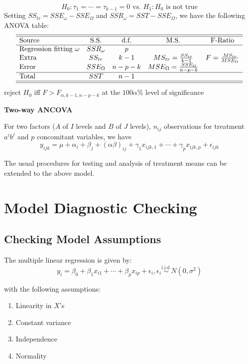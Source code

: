 \documentclass[11pt,a4paper]{article}
\begin{document}
\[
H_0: \tau_1 = \cdots = \tau_{k-1} = 0 \text{ vs. } H_1: H_0 \text{ is not true}
\]
Setting $SS_{tr} = SSE_{\omega} - SSE_{\Omega}$ and $SSR_{\omega} = SST - SSE_{\Omega}$, we have the following ANOVA table:
\[
\begin{array}{lcccc}
    \hline\hline
    \text{Source} & \text{S.S.} & \text{d.f.} & \text{M.S.} & \text{F-Ratio} \\
    \hline
    \text{Regression fitting $\omega$} & SSR_{\omega} & p & & \\
    \text{Extra} & SS_{tr} & k-1 & MS_{tr} = \frac{SS_{tr}}{k-1} & F = \frac{MS_{tr}}{MSE_{\Omega}} \\
    \text{Error} & SSE_{\Omega} & n-p-k & MSE_{\Omega} = \frac{SSE_{\Omega}}{n-p-k} & \\
    \hline
    \text{Total} & SST & n-1 & & \\
    \hline\hline
\end{array}
\]
reject $H_0$ iff $F > F_{\alpha, k-1, n-p-k}$ at the $100\alpha\%$ level of significance \par

\textbf{Two-way ANCOVA} \par
For two factors ($A$ of $I$ levels and $B$ of $J$ levels), $n_{ij}$ observations for treatment $a^i b^j$ and $p$ concomitant variables, we have
\[
y_{ijk} = \mu + \alpha_i + \beta_j + (\alpha \beta)_{ij} + \gamma_1 x_{ijk,1} + \cdots + \gamma_p x_{ijk,p} + \epsilon_{ijk}
\]

The usual procedures for testing and analysis of treatment means can be extended to the above model.

\section{Model Diagnostic Checking}
\subsection{Checking Model Assumptions}
The multiple linear regression is given by:
\[
y_i = \beta_0 + \beta_1 x_{i1} + \cdots + \beta_p x_{ip} + \epsilon_i, \epsilon_i \overset{\text{i.i.d.}}{\sim} N(0, \sigma^2)
\]

with the following assumptions:
\begin{enumerate}
    \item [(A1)] Linearity in $X$'s
    \item [(A2)] Constant variance
    \item [(A3)] Independence
    \item [(A4)] Normality
\end{enumerate}
\end{document}
